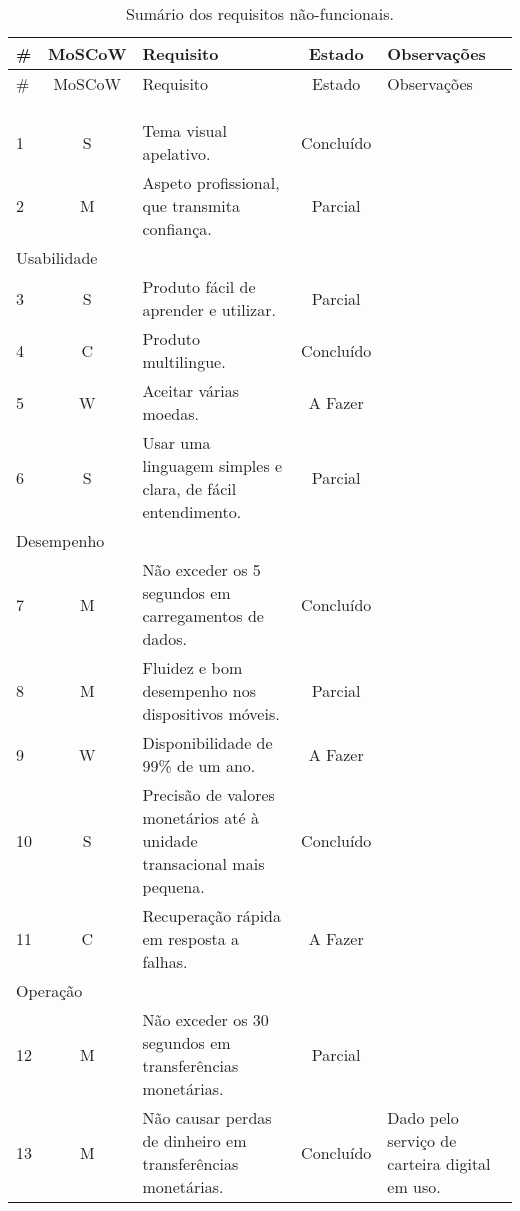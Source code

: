 \begin{center}
\begin{longtable}{@{}lcp{}cp{}@{}}
    \toprule \#  & MoSCoW & Requisito    & Estado   & Observações \\ \midrule
    \endfirsthead
    \toprule \#  & MoSCoW & Requisito    & Estado   & Observações \\ \midrule
    \endhead
    \bottomrule
    \caption{Sumário dos requisitos não-funcionais.}\label{tab:non_func}\\%
    \endfoot
    \bottomrule
    \caption[]{Sumário dos requisitos não-funcionais.}\\%
    \endlastfoot
    \multicolumn{5}{l}{\color{gray} Aparência} \\
    1   & S & Tema visual apelativo. & Concluído &  \\
    2   & M & Aspeto profissional, que transmita confiança. & Parcial &  \\
    \multicolumn{5}{l}{\color{gray} Usabilidade} \\
    3   & S & Produto fácil de aprender e utilizar. & Parcial &  \\
    4   & C & Produto multilingue. & Concluído &  \\
    5   & W & Aceitar várias moedas. & A Fazer &  \\
    6   & S & Usar uma linguagem simples e clara, de fácil entendimento. & Parcial  &  \\
    \multicolumn{5}{l}{\color{gray} Desempenho} \\
    7   & M & Não exceder os 5 segundos em carregamentos de dados. & Concluído &  \\
    8   & M & Fluidez e bom desempenho nos dispositivos móveis. & Parcial &  \\
    9   & W & Disponibilidade de 99\% de um ano. & A Fazer &  \\
    10  & S & Precisão de valores monetários até à unidade transacional mais pequena. & Concluído &  \\
    11  & C & Recuperação rápida em resposta a falhas. & A Fazer &  \\
    \multicolumn{5}{l}{\color{gray} Operação} \\
    12  & M & Não exceder os 30 segundos em transferências monetárias. & Parcial &  \\
    13  & M & Não causar perdas de dinheiro em transferências monetárias. & Concluído & Dado pelo serviço de carteira digital em uso. \\

\end{longtable}
\end{center}
